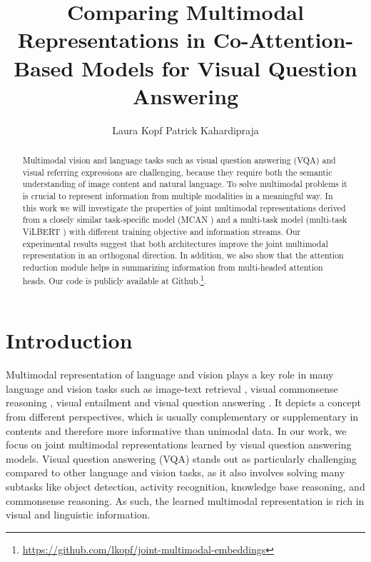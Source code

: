\documentclass{article}
\title{Comparing Multimodal Representations in Co-Attention-Based Models for Visual Question Answering}
\author{%
   Laura Kopf%
  \And
   Patrick Kahardipraja \\
}
\begin{document}
\maketitle


\begin{abstract}
Multimodal vision and language tasks such as visual question answering (VQA) and visual referring expressions are challenging, because they require both the semantic understanding of image content and natural language. To solve multimodal problems it is crucial to represent information from multiple modalities in a meaningful way. %
In this work we will investigate the properties of joint multimodal representations derived from a closely similar task-specific model (MCAN \citep{yu2019mcan}) and a multi-task model (multi-task ViLBERT \citep{lu2020multitask}) with different training objective and information streams. %
Our experimental results suggest that both architectures improve the joint multimodal representation in an orthogonal direction. In addition, we also show that the attention reduction module helps in summarizing information from multi-headed attention heads. Our code is publicly available at Github.\footnote{\url{https://github.com/lkopf/joint-multimodal-embeddings}}. %
\end{abstract}

\section{Introduction}
Multimodal representation of language and vision plays a key role in many language and vision tasks such as image-text retrieval \citep{wang2016retrieval}, visual commonsense reasoning \citep{zellers2019vcr}, visual entailment \citep{xie2019entailment} and visual question answering \citep{antol2015vqa}. It depicts a concept from different perspectives, which is usually complementary or supplementary in contents and therefore more informative than unimodal data. In our work, we focus on joint multimodal representations learned by visual question answering models. Visual question answering (VQA) stands out as particularly challenging compared to other language and vision tasks, as it also involves solving many subtasks like object detection, activity recognition, knowledge base reasoning, and commonsense reasoning. As such, the learned multimodal representation is rich in visual and linguistic information. 
\end{document}
